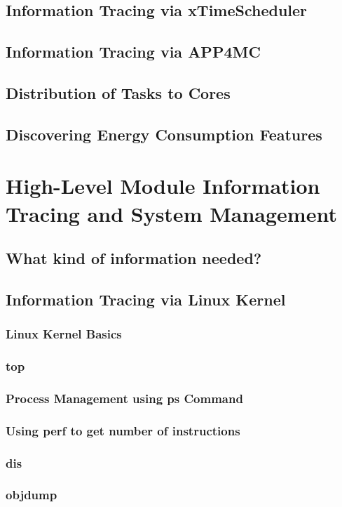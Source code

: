 \subsection{Information Tracing via xTimeScheduler}
\subsection{Information Tracing via APP4MC}
\subsection{Distribution of Tasks to Cores}
\subsection{Discovering Energy Consumption Features}
\section{High-Level Module Information Tracing and System Management}
\subsection{What kind of information needed?}
\subsection{Information Tracing via Linux Kernel}
\subsubsection{Linux Kernel Basics} %
\subsubsection{top} %
\subsubsection{Process Management using ps Command} %
\subsubsection{Using perf to get number of instructions}
\subsubsection{dis}
\subsubsection{objdump}
